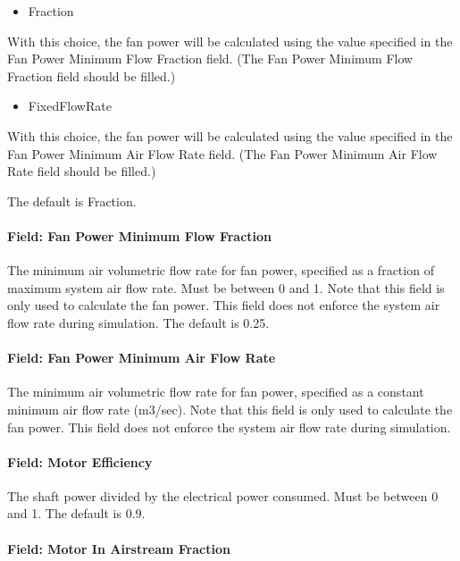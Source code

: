 \begin{itemize}
\tightlist
\item
  Fraction
\end{itemize}

With this choice, the fan power will be calculated using the value specified in the Fan Power Minimum Flow Fraction field. (The Fan Power Minimum Flow Fraction field should be filled.)

\begin{itemize}
\tightlist
\item
  FixedFlowRate
\end{itemize}

With this choice, the fan power will be calculated using the value specified in the Fan Power Minimum Air Flow Rate field. (The Fan Power Minimum Air Flow Rate field should be filled.)

The default is Fraction.

\paragraph{Field: Fan Power Minimum Flow Fraction}\label{field-fan-power-minimum-flow-fraction}

The minimum air volumetric flow rate for fan power, specified as a fraction of maximum system air flow rate. Must be between 0 and 1. Note that this field is only used to calculate the fan power. This field does not enforce the system air flow rate during simulation. The default is 0.25.

\paragraph{Field: Fan Power Minimum Air Flow Rate}\label{field-fan-power-minimum-air-flow-rate}

The minimum air volumetric flow rate for fan power, specified as a constant minimum air flow rate (m3/sec). Note that this field is only used to calculate the fan power. This field does not enforce the system air flow rate during simulation.

\paragraph{Field: Motor Efficiency}\label{field-motor-efficiency-2}

The shaft power divided by the electrical power consumed. Must be between 0 and 1. The default is 0.9.

\paragraph{Field: Motor In Airstream Fraction}\label{field-motor-in-airstream-fraction-2}

